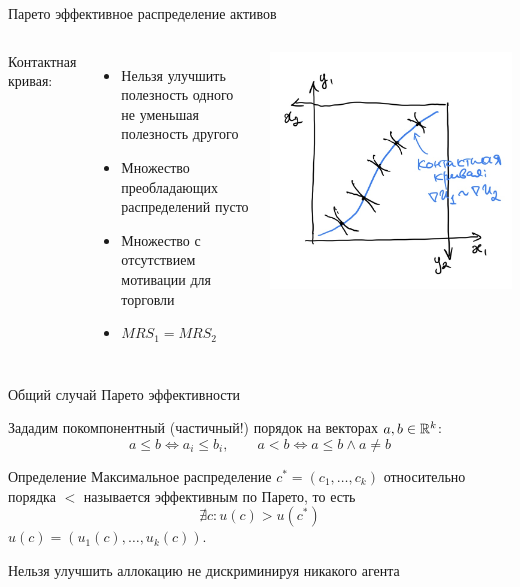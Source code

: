 \documentclass{beamer}
\begin{document}
\begin{frame}{Парето эффективное распределение активов}

\begin{columns}
Контактная кривая: 
\begin{itemize}
    \item Нельзя улучшить полезность одного не уменьшая полезность другого
    \item Множество преобладающих распределений пусто
    \item Множество с отсутствием мотивации для торговли
    \item $MRS_1 = MRS_2$ 
\end{itemize}


        \includegraphics[width=1.0\textwidth]{2_figs/contact.jpeg}


\end{columns}
\end{frame}

\begin{frame}{Общий случай Парето эффективности}

Зададим покомпонентный (частичный!) порядок на векторах $a,b\in \mathbb{R}^k$:
$$
a\leq b \Leftrightarrow a_i \leq b_i, \quad\quad  a<b \Leftrightarrow  a\leq b \land a\neq b
$$

\begin{block}{Определение} 
Максимальное распределение $c^* = (c_1, \ldots, c_k)$ относительно порядка $<$ называется эффективным по Парето, то есть
$$
\nexists c: u(c) > u(c^*)
$$
$u(c) = (u_1(c), \ldots, u_k(c))$.
\end{block}

Нельзя улучшить аллокацию не дискриминируя никакого агента 
    
\end{frame}
\end{document}
